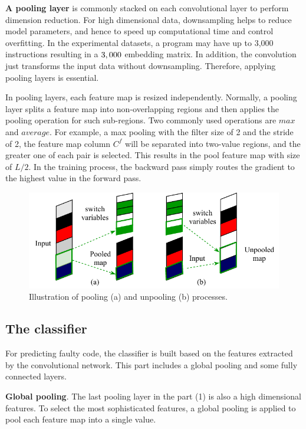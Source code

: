 \textbf{A pooling layer} is commonly stacked on each convolutional layer to perform dimension reduction. For high dimensional data, downsampling helps to reduce model parameters, and hence to speed up computational time and control overfitting. In the experimental datasets, a program may have up to 3,000 instructions resulting in a $3,000 \time 30$ embedding matrix. In addition, the convolution just transforms the input data without downsampling. Therefore, applying pooling layers is essential.

In pooling layers, each feature map is resized independently. Normally, a pooling layer splits a feature map into non-overlapping regions and then applies the pooling operation for such sub-regions. Two commonly used operations are $max$ and $average$. For example, a max pooling with the filter size of 2 and the stride of 2, the feature map column $C^f$ will be separated into two-value regions, and the greater one of each pair is selected. This results in the pool feature map with size of $L/2$. In the training process, the backward pass simply routes the gradient to the highest value in the forward pass. 

    \begin{center}
        \begin{figure}
        \includegraphics[width=\textwidth]{sections/figures/pool_unpool.pdf}
        \caption{Illustration of pooling (a) and unpooling (b) processes.}
        \label{fig:pool_unpool}        
        \end{figure}
    \end{center}
\subsection{The classifier}
For predicting faulty code, the classifier is built based on the features extracted by the convolutional network. This part includes a global pooling and some fully connected layers.

\textbf{Global pooling}. The last pooling layer in the part (1) is also a high dimensional features. To select the most sophisticated features, a global pooling is applied to pool each feature map into a single value.

